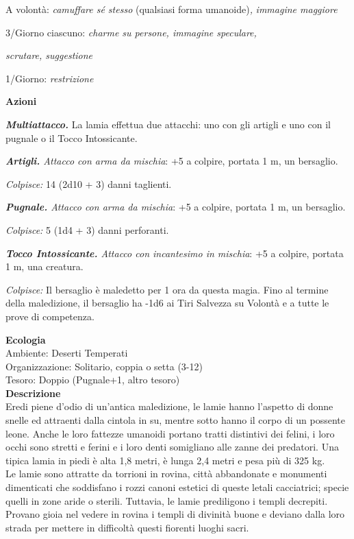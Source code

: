 \begin{multicols}{2}
A volontà: \emph{camuffare sé stesso} (qualsiasi forma umanoide)\emph{,} \emph{immagine maggiore}

3/Giorno ciascuno: \emph{charme su persone, immagine speculare,}

\emph{scrutare, suggestione}

1/Giorno: \emph{restrizione}

\textbf{Azioni}

\emph{\textbf{Multiattacco.}} La lamia effettua due attacchi: uno con
gli artigli e uno con il pugnale o il Tocco Intossicante.

\emph{\textbf{Artigli.} Attacco con arma da mischia}: +5 a colpire, portata 1 m, un bersaglio.

\emph{Colpisce:} 14 (2d10 + 3) danni taglienti.

\emph{\textbf{Pugnale.} Attacco con arma da mischia}: +5 a colpire, portata 1 m, un bersaglio.

\emph{Colpisce:} 5 (1d4 + 3) danni perforanti.

\emph{\textbf{Tocco Intossicante.} Attacco con incantesimo in mischia}: +5 a colpire, portata 1 m, una creatura.

\emph{Colpisce:} Il bersaglio è maledetto per 1 ora da questa magia. Fino al termine della maledizione, il bersaglio ha -1d6 ai Tiri Salvezza su Volontà e a tutte le prove di competenza.

\textbf{Ecologia}\\
Ambiente: Deserti Temperati\\
Organizzazione: Solitario, coppia o setta (3-12)\\
Tesoro: Doppio (Pugnale+1, altro tesoro)\\

\textbf{Descrizione}\\
Eredi piene d'odio di un'antica maledizione, le lamie hanno l'aspetto di donne snelle ed attraenti dalla cintola in su, mentre sotto hanno il corpo di un possente leone. Anche le loro fattezze umanoidi portano tratti distintivi dei felini, i loro occhi sono stretti e ferini e i loro denti somigliano alle zanne dei predatori. Una tipica lamia in piedi è alta 1,8 metri, è lunga 2,4 metri e pesa più di 325 kg.\\

Le lamie sono attratte da torrioni in rovina, città abbandonate e monumenti dimenticati che soddisfano i rozzi canoni estetici di queste letali cacciatrici; specie quelli in zone aride o sterili. Tuttavia, le lamie prediligono i templi decrepiti. Provano gioia nel vedere in rovina i templi di divinità buone e deviano dalla loro strada per mettere in difficoltà questi fiorenti luoghi sacri.\\


\end{multicols}
